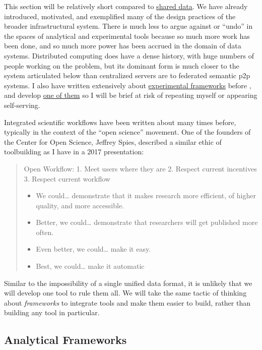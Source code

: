 This section will be relatively short compared to
\protect\hyperlink{shared-data}{shared data}. We have already
introduced, motivated, and exemplified many of the design practices of
the broader infrastructural system. There is much less to argue against
or ``undo'' in the spaces of analytical and experimental tools because
so much more work has been done, and so much more power has been accrued
in the domain of data systems. Distributed computing does have a dense
history, with huge numbers of people working on the problem, but its
dominant form is much closer to the system articulated below than
centralized servers are to federated semantic p2p systems. I also have
written extensively about
\protect\hyperlink{experimental-frameworks}{experimental frameworks}
before \citep{saundersAutopilotAutomatingBehavioral2019} , and
develop \href{https://docs.auto-pi-lot.com/en/latest/}{one of them} so I
will be brief at risk of repeating myself or appearing self-serving.

Integrated scientific workflows have been written about many times
before, typically in the context of the ``open science'' movement. One
of the founders of the Center for Open Science, Jeffrey Spies, described
a similar ethic of toolbuilding as I have in a 2017 presentation:

\begin{quote}
Open Workflow: 1. Meet users where they are 2. Respect current
incentives 3. Respect current workflow

\begin{itemize}
\tightlist
\item
  We could\ldots{} demonstrate that it makes research more efficient, of
  higher quality, and more accessible.
\item
  Better, we could\ldots{} demonstrate that researchers will get
  published more often.
\item
  Even better, we could\ldots{} make it easy.
\item
  Best, we could\ldots{} make it automatic \citep{spiesWorkflowCentricApproachIncreasing2017} 
\end{itemize}
\end{quote}

Similar to the impossibility of a single unified data format, it is
unlikely that we will develop one tool to rule them all. We will take
the same tactic of thinking about \emph{frameworks} to integrate tools
and make them easier to build, rather than building any tool in
particular.

\hypertarget{analytical-frameworks}{%
\subsection{Analytical Frameworks}\label{analytical-frameworks}}

